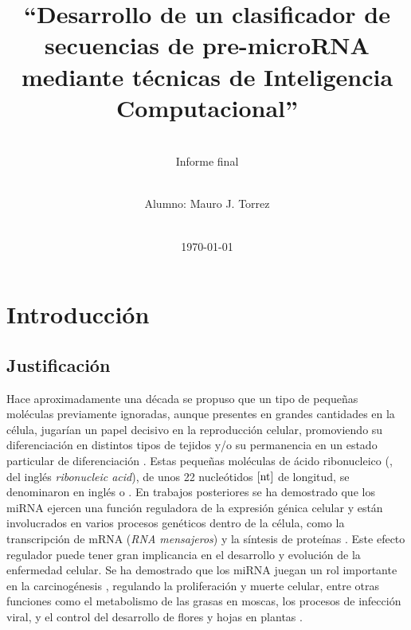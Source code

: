 \documentclass[12pt,bibliography=oldstyle,DIV=12,parskip=half-]{scrreprt}
\begin{document}
%
%
\titlehead{\center\large
    Universidad Nacional del Litoral\\
    Facultad de Ingeniería y Ciencias Hídricas
}
%
%
\title{\LARGE ``Desarrollo de un clasificador de secuencias de pre-microRNA
  mediante técnicas de Inteligencia Computacional''}
\subject{Proyecto Final de Carrera\\Ingeniería en
  Informática}
\subtitle{~\\[.2ex]Informe final\\[.2ex]~}
\author{Alumno: Mauro J. Torrez}
\publishers{Director: Dr. Diego H. Milone}
%
\date{~\\[2em]\today}
%
\renewcommand*{\titlepagestyle}{empty}
\maketitle
\setcounter{page}{1}
%
%
%
%
\chapter{Introducción}
%
\section{Justificación}
%
%
Hace aproximadamente una década se propuso que un tipo de pequeñas
moléculas previamente ignoradas, aunque presentes en grandes
cantidades en la célula, jugarían un papel decisivo en la reproducción
celular, promoviendo su diferenciación en distintos tipos de tejidos
y/o su permanencia en un estado particular de diferenciación
\cite{lee-mammal}.  Estas pequeñas moléculas de ácido ribonucleico
(, del inglés \emph{ribonucleic acid}), de unos 22
nucleótidos $[\textrm{nt}]$ de longitud, se denominaron en inglés  o
.  En trabajos posteriores se ha demostrado que los miRNA
ejercen una función reguladora de la expresión génica celular
\cite{bartel116} y están involucrados en varios procesos genéticos
dentro de la célula, como la transcripción de mRNA (\emph{RNA
  mensajeros}) y la síntesis de proteínas \cite{lili}.  Este efecto
regulador puede tener gran implicancia en el desarrollo y evolución de
la enfermedad celular. Se ha demostrado que los miRNA juegan un rol
importante en la carcinogénesis \cite{aurora}\cite{lili}, regulando la
proliferación y muerte celular, entre otras funciones como el
metabolismo de las grasas en moscas, los procesos de infección viral,
y el control del desarrollo de flores y hojas en plantas
\cite{bartel116}\cite{lecellier}.
\end{document}
